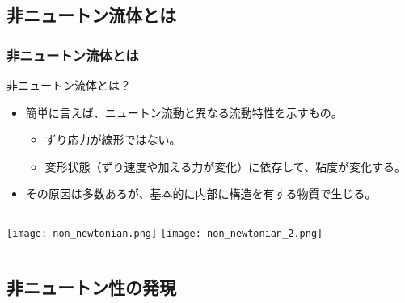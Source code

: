 \documentclass[12pt, dvipdfmx]{beamer}
\begin{document}
\subsection{非ニュートン流体とは}
\begin{frame}
	\frametitle{非ニュートン流体とは}
		\begin{block}{非ニュートン流体とは？}
			\begin{itemize}
				\item 簡単に言えば、ニュートン流動と異なる流動特性を示すもの。
				\begin{itemize}
					\item ずり応力が線形ではない。
					\item 変形状態（ずり速度や加える力が変化）に依存して、粘度が変化する。
				\end{itemize}
				\item その原因は多数あるが、基本的に内部に構造を有する物質で生じる。
			\end{itemize}
		\end{block}
		\begin{columns}[T, onlytextwidth]
				\texttt{[image: non\_newtonian.png]}
				\texttt{[image: non\_newtonian\_2.png]}				
		\end{columns}
\end{frame}

\subsection{非ニュートン性の発現}
\end{document}
